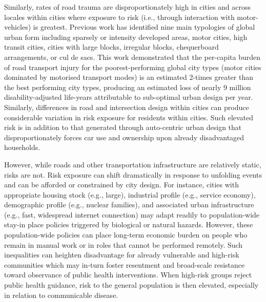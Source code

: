 \documentclass[preprint,12pt]{elsarticle}
\begin{document}
Similarly, rates of road trauma are disproportionately high in cities and across locales within  cities where exposure to risk (i.e., through interaction with motor-vehicles) is greatest. Previous work\cite{Thompson2020} has identified nine main typologies of global urban form including sparsely or intensity developed areas, motor cities, high transit cities, cities with large blocks, irregular blocks, chequerboard arrangements, or cul de sacs. This work demonstrated that the per-capita burden of road transport injury for the poorest-performing global city types (motor cities dominated by motorised transport modes) is an estimated 2-times greater than the best performing city types, producing an estimated loss of nearly 9 million disability-adjusted life-years attributable to sub-optimal urban design per year\cite{Thompson2020}. Similarly, differences in road and intersection design within cities can produce considerable variation in risk exposure for residents within cities\cite{Wijnands_IntersectionDesign2021,MORRISON2019123}. Such elevated risk is in addition to that generated through auto-centric urban design that disproportionately forces car use and ownership upon already disadvantaged households\cite{currie2018alarming, CURL201861}. 

However, while roads and other transportation infrastructure are relatively static, risks are not. Risk exposure can shift dramatically in response to unfolding events and can be afforded or constrained by city design. For instance, cities with appropriate housing stock (e.g., large), industrial profile (e.g., service economy), demographic profile (e.g., nuclear families), and associated urban infrastructure (e.g., fast, widespread internet connection) may adapt readily to population-wide stay-in place policies triggered by biological or natural hazards\cite{hale2021global}. However, these population-wide policies can place long-term economic burden on people who remain in manual work or in roles that cannot be performed remotely\cite{CraigWFH,Vyas2021}. Such inequalities can heighten disadvantage for already vulnerable and high-risk communities\cite{martin2020fighting} which may in-turn foster resentment and broad-scale resistance toward observance of public health interventions\cite{de2016sustainability}. When high-risk groups reject public health guidance, risk to the general population is then elevated, especially in relation to communicable disease\cite{koopman2005control}.
\end{document}
